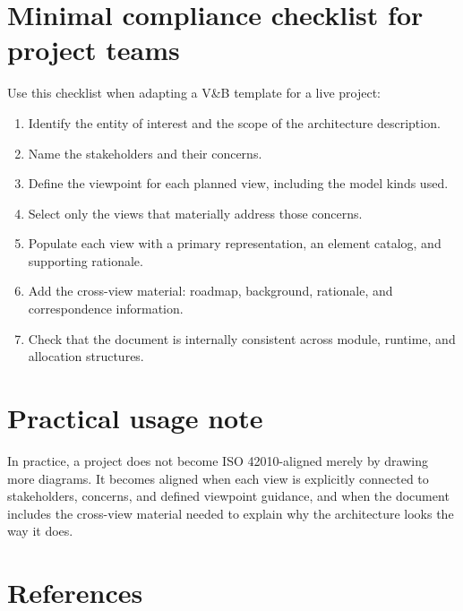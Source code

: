 \documentclass[11pt]{article}
\begin{document}
\section{Minimal compliance checklist for project teams}

Use this checklist when adapting a V\&B template for a live project:
\begin{enumerate}[leftmargin=1.5em]
    \item Identify the entity of interest and the scope of the architecture description.
    \item Name the stakeholders and their concerns.
    \item Define the viewpoint for each planned view, including the model kinds used.
    \item Select only the views that materially address those concerns.
    \item Populate each view with a primary representation, an element catalog, and supporting rationale.
    \item Add the cross-view material: roadmap, background, rationale, and correspondence information.
    \item Check that the document is internally consistent across module, runtime, and allocation structures.
\end{enumerate}

\section{Practical usage note}

In practice, a project does not become ISO 42010-aligned merely by drawing more diagrams. It becomes aligned when each view is explicitly connected to stakeholders, concerns, and defined viewpoint guidance, and when the document includes the cross-view material needed to explain why the architecture looks the way it does.

\section{References}
\end{document}
